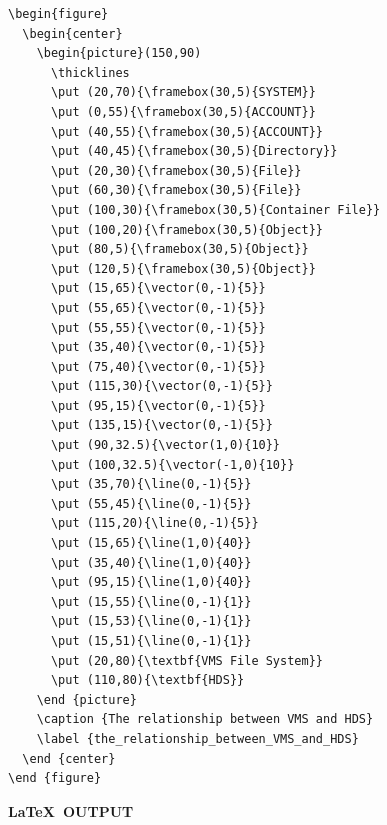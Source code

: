 \documentclass[twoside,11pt]{article}
\renewcommand{\_}{\texttt{\symbol{95}}}
\begin{document}
\begin{verbatim}
\begin{figure}
  \begin{center}
    \begin{picture}(150,90)
      \thicklines
      \put (20,70){\framebox(30,5){SYSTEM}}
      \put (0,55){\framebox(30,5){ACCOUNT}}
      \put (40,55){\framebox(30,5){ACCOUNT}}
      \put (40,45){\framebox(30,5){Directory}}
      \put (20,30){\framebox(30,5){File}}
      \put (60,30){\framebox(30,5){File}}
      \put (100,30){\framebox(30,5){Container File}}
      \put (100,20){\framebox(30,5){Object}}
      \put (80,5){\framebox(30,5){Object}}
      \put (120,5){\framebox(30,5){Object}}
      \put (15,65){\vector(0,-1){5}}
      \put (55,65){\vector(0,-1){5}}
      \put (55,55){\vector(0,-1){5}}
      \put (35,40){\vector(0,-1){5}}
      \put (75,40){\vector(0,-1){5}}
      \put (115,30){\vector(0,-1){5}}
      \put (95,15){\vector(0,-1){5}}
      \put (135,15){\vector(0,-1){5}}
      \put (90,32.5){\vector(1,0){10}}
      \put (100,32.5){\vector(-1,0){10}}
      \put (35,70){\line(0,-1){5}}
      \put (55,45){\line(0,-1){5}}
      \put (115,20){\line(0,-1){5}}
      \put (15,65){\line(1,0){40}}
      \put (35,40){\line(1,0){40}}
      \put (95,15){\line(1,0){40}}
      \put (15,55){\line(0,-1){1}}
      \put (15,53){\line(0,-1){1}}
      \put (15,51){\line(0,-1){1}}
      \put (20,80){\textbf{VMS File System}}
      \put (110,80){\textbf{HDS}}
    \end {picture}
    \caption {The relationship between VMS and HDS}
    \label {the_relationship_between_VMS_and_HDS}
  \end {center}
\end {figure}
\end{verbatim}

\newpage

\begin{center}
  \textbf{\LaTeX\ OUTPUT}
\end{center}
\end{document}
